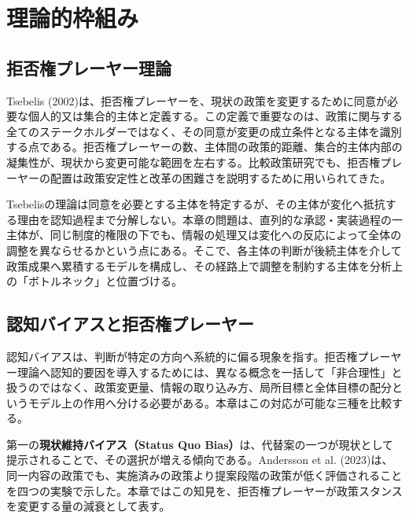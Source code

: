 \section{理論的枠組み}
\label{sec:ch3_framework}

\subsection{拒否権プレーヤー理論}

Tsebelis (2002)は、拒否権プレーヤーを、現状の政策を変更するために同意が必要な個人的又は集合的主体と定義する\cite{tsebelis2002veto}。この定義で重要なのは、政策に関与する全てのステークホルダーではなく、その同意が変更の成立条件となる主体を識別する点である。拒否権プレーヤーの数、主体間の政策的距離、集合的主体内部の凝集性が、現状から変更可能な範囲を左右する。比較政策研究でも、拒否権プレーヤーの配置は政策安定性と改革の困難さを説明するために用いられてきた\cite{jahn2011veto}。

Tsebelisの理論は同意を必要とする主体を特定するが、その主体が変化へ抵抗する理由を認知過程まで分解しない。本章の問題は、直列的な承認・実装過程の一主体が、同じ制度的権限の下でも、情報の処理又は変化への反応によって全体の調整を異ならせるかという点にある。そこで、各主体の判断が後続主体を介して政策成果へ累積するモデルを構成し、その経路上で調整を制約する主体を分析上の「ボトルネック」と位置づける。

\subsection{認知バイアスと拒否権プレーヤー}

認知バイアスは、判断が特定の方向へ系統的に偏る現象を指す\cite{kahneman2011thinking}。拒否権プレーヤー理論へ認知的要因を導入するためには、異なる概念を一括して「非合理性」と扱うのではなく、政策変更量、情報の取り込み方、局所目標と全体目標の配分というモデル上の作用へ分ける必要がある。本章はこの対応が可能な三種を比較する。

第一の\textbf{現状維持バイアス（Status Quo Bias）}は、代替案の一つが現状として提示されることで、その選択が増える傾向である\cite{samuelson1988status}。Andersson et al. (2023)は、同一内容の政策でも、実施済みの政策より提案段階の政策が低く評価されることを四つの実験で示した\cite{andersson2023status}。本章ではこの知見を、拒否権プレーヤーが政策スタンスを変更する量の減衰として表す。

